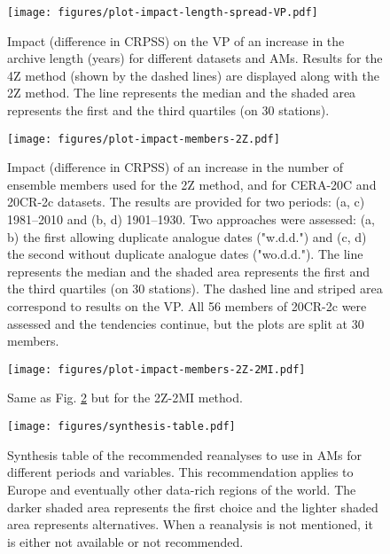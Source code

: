 \documentclass{ametsoc}
\begin{document}
	\begin{figure}[t]
		\noindent\texttt{[image: figures/plot-impact-length-spread-VP.pdf]}\\
		\caption{Impact (difference in CRPSS) on the VP of an increase in the archive length (years) for different datasets and AMs. Results for the 4Z method (shown by the dashed lines) are displayed along with the 2Z method. The line represents the median and the shaded area represents the first and the third quartiles (on 30 stations).}
		\label{fig:plot_impact_length}
	\end{figure}
	
	\begin{figure}[t]
		\noindent\texttt{[image: figures/plot-impact-members-2Z.pdf]}\\
		\caption{Impact (difference in CRPSS) of an increase in the number of ensemble members used for the 2Z method, and for CERA-20C and 20CR-2c datasets. The results are provided for two periods: (a, c) 1981--2010 and (b, d) 1901--1930. Two approaches were assessed: (a, b) the first allowing duplicate analogue dates ("w.d.d.") and (c, d) the second without duplicate analogue dates ("wo.d.d."). The line represents the median and the shaded area represents the first and the third quartiles (on 30 stations). The dashed line and striped area correspond to results on the VP. All 56 members of 20CR-2c were assessed and the tendencies continue, but the plots are split at 30 members.}
		\label{fig:plot_impact_members_2Z}
	\end{figure}
	
	\begin{figure}[t]
		\noindent\texttt{[image: figures/plot-impact-members-2Z-2MI.pdf]}\\
		\caption{Same as Fig. \ref{fig:plot_impact_members_2Z} but for the 2Z-2MI method.}
		\label{fig:plot_impact_members_2Z-2MI}
	\end{figure}
	
	\begin{figure}[t]
		\noindent\texttt{[image: figures/synthesis-table.pdf]}\\
		\caption{Synthesis table of the recommended reanalyses to use in AMs for different periods and variables. This recommendation applies to Europe and eventually other data-rich regions of the world. The darker shaded area represents the first choice and the lighter shaded area represents alternatives. When a reanalysis is not mentioned, it is either not available or not recommended.}
		\label{fig:synthesis-table}
	\end{figure}
	
\end{document}
